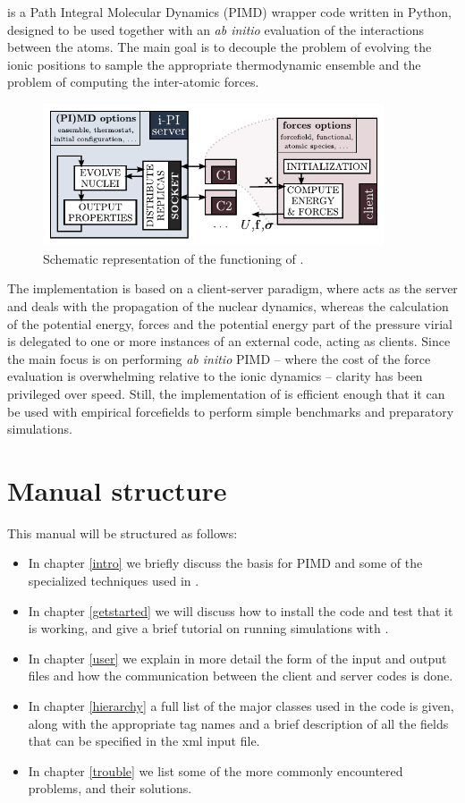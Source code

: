 \documentclass[11pt,english,fleqn]{report}
\begin{document}
\label{intro}

\ipi is a Path Integral Molecular Dynamics (PIMD) wrapper code written
in Python, designed to be used together with an \emph{ab initio} evaluation
of the interactions between the atoms. The main goal is to decouple
the problem of evolving the ionic positions to sample the appropriate
thermodynamic ensemble and the problem of computing the inter-atomic
forces. 

\begin{figure}[hb]
\centering\includegraphics[width=0.9\textwidth]{ipi-scheme.pdf}
\caption{\label{fig:scheme} Schematic representation of the functioning of \ipi{}.} 
\end{figure}

The implementation is based on a client-server paradigm, where \ipi
acts as the server and deals with the propagation of the nuclear dynamics,
whereas the calculation of the potential energy, forces and the potential
energy part of the pressure virial is delegated to one or more instances
of an external code, acting as clients. Since the main focus is on
performing \emph{ab initio} PIMD -- where the cost of the force evaluation
is overwhelming relative to the ionic dynamics -- clarity has been
privileged over speed. Still, the implementation of \ipi is efficient
enough that it can be used with empirical forcefields to perform simple
benchmarks and preparatory simulations. 


\section{Manual structure}

This manual will be structured as follows: 
\begin{itemize}
\item In chapter \ref{intro} we briefly discuss the basis for PIMD and
some of the specialized techniques used in \ipi. 
\item In chapter \ref{getstarted} we will discuss how to install the code
and test that it is working, and give a brief tutorial on running
simulations with \ipi.
\item In chapter \ref{user} we explain in more detail the form of the input
and output files and how the communication between the client and
server codes is done.
\item In chapter \ref{hierarchy} a full list of the major classes used
in the code is given, along with the appropriate tag names and a brief
description of all the fields that can be specified in the xml input
file.
\item In chapter \ref{trouble} we list some of the more commonly encountered
problems, and their solutions.
\end{itemize}
\end{document}
